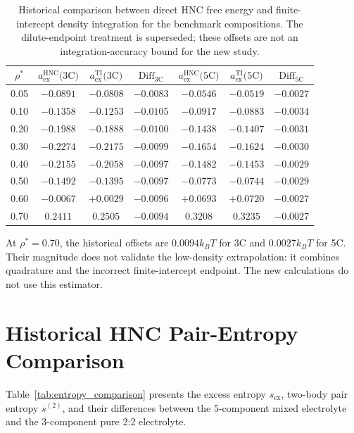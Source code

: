 \documentclass[11pt,a4paper]{article}
\begin{document}
\begin{table}[htbp]
\centering
\caption{Historical comparison between direct HNC free energy and finite-intercept density integration for the benchmark compositions. The dilute-endpoint treatment is superseded; these offsets are not an integration-accuracy bound for the new study.}
\label{tab:ti_comparison}
\small
\begin{tabular}{ccccccc}
\toprule
$\rho^*$ & $a_{\text{ex}}^{\text{HNC}}\text{(3C)}$ & $a_{\text{ex}}^{\text{TI}}\text{(3C)}$ & $\text{Diff}_{\text{3C}}$ & $a_{\text{ex}}^{\text{HNC}}\text{(5C)}$ & $a_{\text{ex}}^{\text{TI}}\text{(5C)}$ & $\text{Diff}_{\text{5C}}$ \\
\midrule
0.05 & $-0.0891$ & $-0.0808$ & $-0.0083$ & $-0.0546$ & $-0.0519$ & $\mathbf{-0.0027}$ \\
0.10 & $-0.1358$ & $-0.1253$ & $-0.0105$ & $-0.0917$ & $-0.0883$ & $\mathbf{-0.0034}$ \\
0.20 & $-0.1988$ & $-0.1888$ & $-0.0100$ & $-0.1438$ & $-0.1407$ & $\mathbf{-0.0031}$ \\
0.30 & $-0.2274$ & $-0.2175$ & $-0.0099$ & $-0.1654$ & $-0.1624$ & $\mathbf{-0.0030}$ \\
0.40 & $-0.2155$ & $-0.2058$ & $-0.0097$ & $-0.1482$ & $-0.1453$ & $\mathbf{-0.0029}$ \\
0.50 & $-0.1492$ & $-0.1395$ & $-0.0097$ & $-0.0773$ & $-0.0744$ & $\mathbf{-0.0029}$ \\
0.60 & $-0.0067$ & $+0.0029$ & $-0.0096$ & $+0.0693$ & $+0.0720$ & $\mathbf{-0.0027}$ \\
0.70 & $\mathbf{0.2411}$ & $\mathbf{0.2505}$ & $\mathbf{-0.0094}$ & $\mathbf{0.3208}$ & $\mathbf{0.3235}$ & $\mathbf{-0.0027}$ \\
\bottomrule
\end{tabular}
\end{table}

At $\rho^*=0.70$, the historical offsets are $0.0094k_BT$ for 3C and $0.0027k_BT$ for 5C. Their magnitude does not validate the low-density extrapolation: it combines quadrature and the incorrect finite-intercept endpoint. The new calculations do not use this estimator.

\section{Historical HNC Pair-Entropy Comparison}

Table~\ref{tab:entropy_comparison} presents the excess entropy $s_{\text{ex}}$, two-body pair entropy $s^{(2)}$, and their differences between the 5-component mixed electrolyte and the 3-component pure 2:2 electrolyte.
\end{document}
